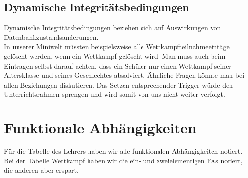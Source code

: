 \documentclass[pagesize,11pt,twoside]{scrartcl}
\begin{document}
\subsection{Dynamische Integritätsbedingungen}
Dynamische Integritätsbedingungen beziehen sich auf Auswirkungen von Datenbankzustandsänderungen.\\
In unserer Miniwelt müssten beispielsweise alle Wettkampfteilnahmeeintäge gelöscht werden,
wenn ein Wettkampf gelöscht wird. 
Man muss auch beim Eintragen selbst darauf achten, dass ein Schüler nur einen
Wettkampf seiner Altersklasse und seines Geschlechtes absolviert.
Ähnliche Fragen könnte man bei allen Beziehungen diskutieren.
Das Setzen entsprechender Trigger würde den Unterrichtsrahmen sprengen 
und wird somit von uns nicht weiter verfolgt.

\newpage
\section{Funktionale Abhängigkeiten}

Für die Tabelle des Lehrers haben wir alle funktionalen Abhängigkeiten notiert. Bei der Tabelle 
Wettkampf haben wir die ein- und zweielementigen FAs notiert, die anderen aber erspart.
 
\end{document}
